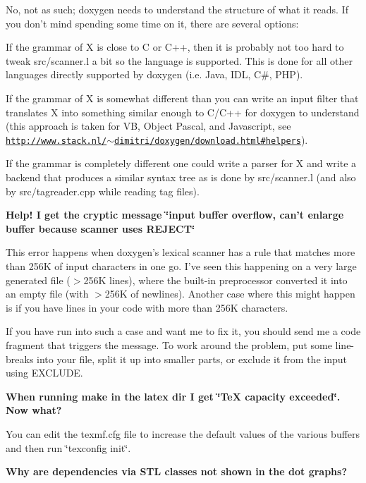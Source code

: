 \begin{DoxyEnumerate}
No, not as such; doxygen needs to understand the structure of what it reads. If you don't mind spending some time on it, there are several options:
\begin{DoxyItemize}
\item If the grammar of X is close to C or C++, then it is probably not too hard to tweak src/scanner.l a bit so the language is supported. This is done for all other languages directly supported by doxygen (i.e. Java, IDL, C\#, PHP).
\item If the grammar of X is somewhat different than you can write an input filter that translates X into something similar enough to C/C++ for doxygen to understand (this approach is taken for VB, Object Pascal, and Javascript, see \href{http://www.stack.nl/~dimitri/doxygen/download.html#helpers}{\tt http://www.stack.nl/$\sim$dimitri/doxygen/download.html\#helpers}).
\item If the grammar is completely different one could write a parser for X and write a backend that produces a similar syntax tree as is done by src/scanner.l (and also by src/tagreader.cpp while reading tag files).
\end{DoxyItemize}


\item {\bfseries Help! I get the cryptic message \char`\"{}input buffer overflow, can't enlarge buffer because scanner uses REJECT\char`\"{}}

This error happens when doxygen's lexical scanner has a rule that matches more than 256K of input characters in one go. I've seen this happening on a very large generated file ($>$256K lines), where the built-\/in preprocessor converted it into an empty file (with $>$256K of newlines). Another case where this might happen is if you have lines in your code with more than 256K characters.

If you have run into such a case and want me to fix it, you should send me a code fragment that triggers the message. To work around the problem, put some line-\/breaks into your file, split it up into smaller parts, or exclude it from the input using EXCLUDE.


\item {\bfseries When running make in the latex dir I get \char`\"{}TeX capacity exceeded\char`\"{}. Now what?}

You can edit the texmf.cfg file to increase the default values of the various buffers and then run \char`\"{}texconfig init\char`\"{}.


\item {\bfseries Why are dependencies via STL classes not shown in the dot graphs?}


\end{DoxyEnumerate}
